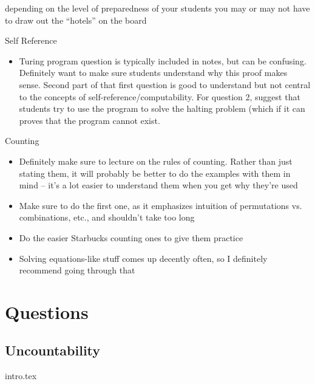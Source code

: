 \documentclass{exam}
\begin{document}
\begin{questions}
\begin{itemize}
\begin{itemize}
depending on the level of preparedness of your students you may or may not have to draw out the “hotels” on the board
\end{itemize}
\end{itemize}
\item Self Reference
\begin{itemize}
\item Turing program question is typically included in notes, but can be confusing. Definitely want to make sure students understand why this proof makes sense. Second part of that first question is good to understand but not central to the concepts of self-reference/computability. For question 2, suggest that students try to use the program to solve the halting problem (which if it can proves that the program cannot exist.
\end{itemize}
\item Counting
\begin{itemize}
\item Definitely make sure to lecture on the rules of counting. Rather than just stating them, it will probably be better to do the examples with them in mind – it’s a lot easier to understand them when you get why they’re used
\item Make sure to do the first one, as it emphasizes intuition of permutations vs. combinations, etc., and shouldn’t take too long
\item Do the easier Starbucks counting ones to give them practice
\item Solving equations-like stuff comes up decently often, so I definitely recommend going through that
\end{itemize}
\end{questions}

\section{Questions}
\subsection{Uncountability}
\begin{enumerate}
{intro.tex}
\end{enumerate}
\end{document}
